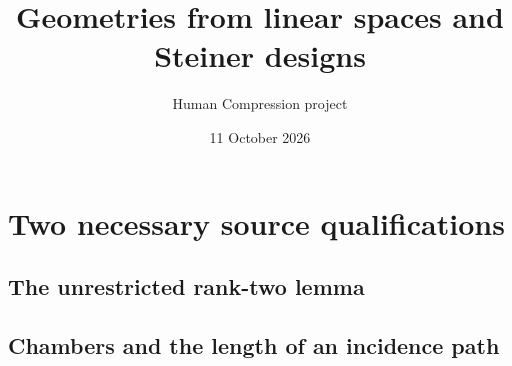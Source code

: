 \documentclass[
  11pt,
  a4paper,
]{article}
\title{Geometries from linear spaces and Steiner designs}
\author{Human Compression project}
\date{11 October 2026}
\begin{document}
\maketitle










\section{Two necessary source qualifications}
\subsection{The unrestricted rank-two lemma}

\subsection{Chambers and the length of an incidence path}


\end{document}
